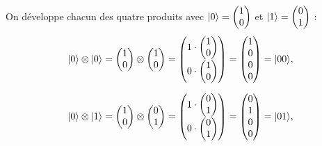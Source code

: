 On développe chacun des quatre produits avec $|0\rangle=\begin{pmatrix}1\\ 0\end{pmatrix}$
et $|1\rangle=\begin{pmatrix}0\\ 1\end{pmatrix}$ :
\begin{align*}
  \ket{0}\otimes\ket{0}&=\begin{pmatrix}1\\ 0\end{pmatrix}\otimes\begin{pmatrix}1\\ 0\end{pmatrix}
    =\begin{pmatrix}1\cdot\begin{pmatrix}1\\ 0\end{pmatrix}\\[1.5ex]0\cdot\begin{pmatrix}1\\ 0\end{pmatrix}\end{pmatrix}
    =\begin{pmatrix}1\\ 0\\ 0\\ 0\end{pmatrix}=\ket{00},\\[1.5ex]
  \ket{0}\otimes\ket{1}&=\begin{pmatrix}1\\ 0\end{pmatrix}\otimes\begin{pmatrix}0\\ 1\end{pmatrix}
    =\begin{pmatrix}1\cdot\begin{pmatrix}0\\ 1\end{pmatrix}\\[1.5ex]0\cdot\begin{pmatrix}0\\ 1\end{pmatrix}\end{pmatrix}
    =\begin{pmatrix}0\\ 1\\ 0\\ 0\end{pmatrix}=\ket{01},\\[1.5ex]

\end{align*}
